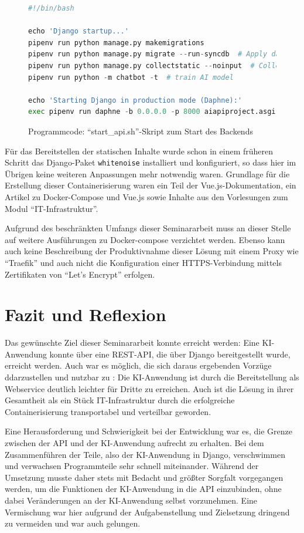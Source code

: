 \documentclass[12pt,oneside,titlepage,listof=totoc,bibliography=totoc]{scrartcl}
\newcommand{\code}[1]{\colorbox{code-gray}{\texttt{#1}}}
\begin{document}
\begin{figure}[H]
	\caption{Programmcode: \enquote{start_api.sh}-Skript zum Start des Backends}
	\label{fig:code-start-api-backend}
\begin{lstlisting}[language=python]
#!/bin/bash

echo 'Django startup...'
pipenv run python manage.py makemigrations
pipenv run python manage.py migrate --run-syncdb  # Apply database migrations
pipenv run python manage.py collectstatic --noinput  # Collect static files
pipenv run python -m chatbot -t  # train AI model

echo 'Starting Django in production mode (Daphne):'
exec pipenv run daphne -b 0.0.0.0 -p 8000 aiapiproject.asgi:application
\end{lstlisting}
\end{figure}

Für das Bereitstellen der statischen Inhalte wurde schon in einem früheren Schritt das Django-Paket \code{whitenoise} installiert und konfiguriert, so dass hier im Übrigen keine weiteren Anpassungen mehr notwendig waren. Grundlage für die Erstellung dieser Containerisierung waren ein Teil der Vue.js-Dokumentation\parencite{60-docker-vue2}, ein Artikel zu Docker-Compose und Vue.js \parencite{59-docker-vue} sowie Inhalte aus den Vorlesungen zum Modul \enquote{IT-Infrastruktur}.

Aufgrund des beschränkten Umfangs dieser Seminararbeit muss an dieser Stelle auf weitere Ausführungen zu Docker-compose verzichtet werden. Ebenso kann auch keine Beschreibung der Produktivnahme dieser Lösung mit einem Proxy wie \enquote{Traefik} und auch nicht die Konfiguration einer HTTPS-Verbindung mittels Zertifikaten von \enquote{Let's Encrypt} erfolgen. 

\section{Fazit und Reﬂexion}

Das gewünschte Ziel dieser Seminararbeit konnte erreicht werden: Eine KI-Anwendung konnte über eine REST-API, die über Django bereitgestellt wurde, erreicht werden. Auch war es möglich, die sich daraus ergebenden Vorzüge ddarzustellen und nutzbar zu : Die KI-Anwendung ist durch die Bereitstellung als Webservice deutlich leichter für Dritte zu erreichen. Auch ist die Lösung in ihrer Gesamtheit als ein Stück IT-Infrastruktur durch die erfolgreiche Containerisierung transportabel und verteilbar geworden.

Eine Herausforderung und Schwierigkeit bei der Entwicklung war es, die Grenze zwischen der API und der KI-Anwendung aufrecht zu erhalten. Bei dem Zusammenführen der Teile, also der KI-Anwendung in Django,  verschwimmen und verwachsen Programmteile sehr schnell miteinander. Während der Umsetzung musste daher stets mit Bedacht und größter Sorgfalt vorgegangen werden, um die Funktionen der KI-Anwendung in die API einzubinden, ohne dabei Veränderungen an der KI-Anwendung selbst vorzunehmen. Eine Vermischung war hier aufgrund der Aufgabenstellung und Zielsetzung dringend zu vermeiden und war auch gelungen. 
\end{document}
